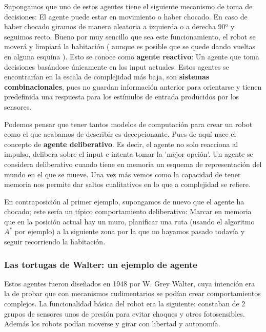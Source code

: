 \vspace{10px}

Supongamos que uno de estos agentes tiene el siguiente mecanismo de toma de decisiones: El agente puede estar en movimiento o haber chocado. En caso de haber chocado giramos de manera aleatoria a izquierda o a derecha 90º y seguimos recto. Bueno por muy sencillo que sea este funcionamiento, el robot se moverá y limpiará la habitación ( aunque es posible que se quede dando vueltas en alguna esquina ). Esto se conoce como \textbf{agente reactivo}: Un agente que toma decisiones basándose únicamente en los input actuales. Estos agentes se encontrarían en la escala de complejidad más baja, son \textbf{sistemas combinacionales}, pues no guardan información anterior para orientarse y tienen predefinida una respuesta para los estímulos de entrada producidos por los sensores.


\vspace{10px}

Podemos pensar que tener tantos modelos de computación para crear un robot como el que acabamos de describir es decepcionante. Pues de aquí nace el concepto de \textbf{agente deliberativo}. Es decir, el agente no solo reacciona al impulso, delibera sobre el input e intenta tomar la 'mejor opción'. Un agente se considera deliberativo cuando tiene en memoria un esquema de representación del mundo en el que se mueve. Una vez más vemos como la capacidad de tener memoria nos permite dar saltos cualitativos en lo que a complejidad se refiere.

\vspace{10px}

En contraposición al primer ejemplo, supongamos de nuevo que el agente ha chocado; este sería un típico comportamiento deliberativo: Marcar en memoria que en la posición actual hay un muro, planificar una ruta (usando el algoritmo $A^*$ por ejemplo) a la siguiente zona por la que no hayamos pasado todavía y seguir recorriendo la habitación.

\subsubsection{Las tortugas de Walter: un ejemplo de agente}

Estos agentes fueron diseñados en 1948 por W. Grey Walter, cuya intención era la de probar que con mecanismos rudimentarios se podían crear comportamientos complejos. La funcionalidad básica del robot era la siguiente: constaban de 2 grupos de sensores unos de presión para evitar choques y otros fotosensibles. Además los robots podían moverse y girar con libertad y autonomía.

